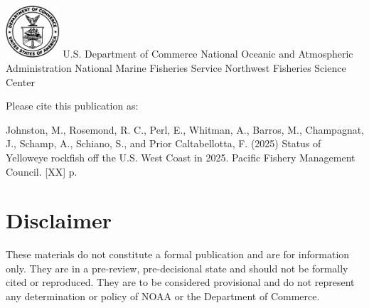\documentclass[
]{scrartcl}
\renewcommand*\contentsname{Table of contents}
\newcommand\contentsname{Table of contents}
\begin{document}
\begin{titlepage}
\begin{minipage}[b][\textheight][s]{\textwidth}
  \includegraphics[alt={},width=2cm]{support_files/us_doc_logo.png}\newline %
  U.S. Department of Commerce\newline
  National Oceanic and Atmospheric Administration\newline
  National Marine Fisheries Service\newline
  Northwest Fisheries Science Center\newline

  \end{minipage}
  \restoregeometry
  \end{titlepage}

\renewcommand*\contentsname{Table of contents}
{
\hypersetup{linkcolor=}
\setcounter{tocdepth}{3}
\tableofcontents
}

\setcounter{page}{1}

\renewcommand{\thetable}{\roman{table}}
\renewcommand{\thefigure}{\roman{figure}}

\newpage{}

Please cite this publication as:

Johnston, M., Rosemond, R. C., Perl, E., Whitman, A., Barros, M.,
Champagnat, J., Schamp, A., Schiano, S., and Prior Caltabellotta, F.
(2025) Status of Yelloweye rockfish off the U.S. West Coast in 2025.
Pacific Fishery Management Council. {[}XX{]} p.

\newpage{}

\setcounter{page}{1}

\renewcommand{\thetable}{\roman{table}}
\renewcommand{\thefigure}{\roman{figure}}

\section*{Disclaimer}\label{disclaimer}

These materials do not constitute a formal publication and are for
information only. They are in a pre-review, pre-decisional state and
should not be formally cited or reproduced. They are to be considered
provisional and do not represent any determination or policy of NOAA or
the Department of Commerce.
\end{document}
